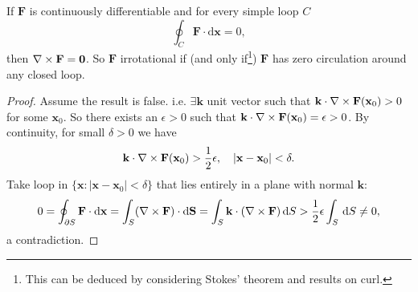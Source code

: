 \begin{proposition}
    If $\mathbf{F}$ is continuously differentiable and for every simple loop $C$ 
    \[
        \oint_{C} \mathbf{F} \cdot \mathrm{d}\mathbf{x} = 0,
    \]
    then $ \nabla\times \mathbf{F}=\mathbf{0} $. So $\mathbf{F}$ irrotational if (and only if\footnote{This can be deduced by considering Stokes' theorem and results on curl.}) $\mathbf{F}$ has zero circulation around any closed loop.
\end{proposition}
\begin{proof}
    Assume the result is false. i.e. $ \exists \mathbf{k} $ unit vector such that $ \mathbf{k} \cdot \nabla\times\mathbf{F}(\mathbf{x}_0)>0 $ for some $ \mathbf{x}_0 $. So there exists an $\epsilon > 0$ such that $ \mathbf{k} \cdot \nabla\times\mathbf{F}(\mathbf{x}_0)=\epsilon>0 $. By continuity, for small $ \delta>0 $ we have
    \[
        \mathbf{k} \cdot \nabla\times\mathbf{F}(\mathbf{x}_0)>\frac{1}{2}\epsilon,\quad |\mathbf{x}-\mathbf{x}_0|<\delta.
    \]
    Take loop in $ \{\mathbf{x}:|\mathbf{x}-\mathbf{x}_0|<\delta\} $ that lies entirely in a plane with normal $\mathbf{k}$:
    \[
        0=\oint_{\partial S} \mathbf{F} \cdot\mathrm{d}\mathbf{x} = \int_{S} (\nabla\times\mathbf{F}) \cdot\mathrm{d}\mathbf{S} = \int_{S} \mathbf{k} \cdot (\nabla\times\mathbf{F}) \,\mathrm{d}S>\frac{1}{2}\epsilon \int_{S}  \,\mathrm{d}S\neq 0,
    \]
    a contradiction.
\end{proof}
